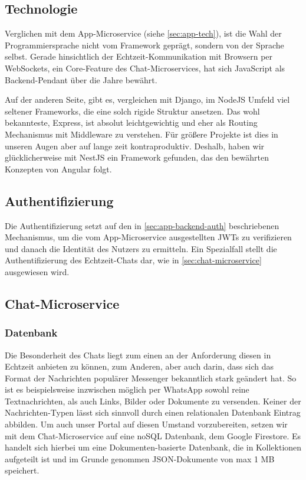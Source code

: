 \documentclass{article}
\begin{document}
\subsection{Technologie}

Verglichen mit dem App-Microservice (siehe \autoref{sec:app-tech}), ist die Wahl der Programmiersprache nicht vom Framework geprägt, sondern von der Sprache selbst. Gerade hinsichtlich der Echtzeit-Kommunikation mit Browsern per WebSockets, ein Core-Feature des Chat-Microservices, hat sich JavaScript als Backend-Pendant über die Jahre bewährt. 

Auf der anderen Seite, gibt es, vergleichen mit Django, im NodeJS Umfeld viel seltener Frameworks, die eine solch rigide Struktur ansetzen. Das wohl bekannteste, Express, ist absolut leichtgewichtig und eher als Routing Mechanismus mit Middleware zu verstehen. Für größere Projekte ist dies in unseren Augen aber auf lange zeit kontraproduktiv. Deshalb, haben wir glücklicherweise mit NestJS ein Framework gefunden, das den bewährten Konzepten von Angular folgt. 

\subsection{Authentifizierung}

Die Authentifizierung setzt auf den in \autoref{sec:app-backend-auth} beschriebenen Mechanismus, um die vom App-Microservice ausgestellten JWTs zu verifizieren und danach die Identität des Nutzers zu ermitteln. Ein Spezialfall stellt die Authentifizierung des Echtzeit-Chats dar, wie in \autoref{sec:chat-microservice} ausgewiesen wird.



\subsection{Chat-Microservice}
\label{sec:chat-microservice}



\subsubsection{Datenbank}

Die Besonderheit des Chats liegt zum einen an der Anforderung diesen in Echtzeit anbieten zu können, zum Anderen, aber auch darin, dass sich das Format der Nachrichten populärer Messenger bekanntlich stark geändert hat. So ist es beispielsweise inzwischen möglich per WhatsApp sowohl reine Textnachrichten, als auch Links, Bilder oder Dokumente zu versenden. Keiner der Nachrichten-Typen lässt sich sinnvoll durch einen relationalen Datenbank Eintrag abbilden. Um auch unser Portal auf diesen Umstand vorzubereiten, setzen wir mit dem Chat-Microservice auf eine noSQL Datenbank, dem Google Firestore. Es handelt sich hierbei um eine Dokumenten-basierte Datenbank, die in Kollektionen aufgeteilt ist und im Grunde genommen JSON-Dokumente von max 1 MB speichert. 
\end{document}
